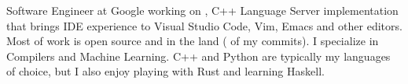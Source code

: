 
\begin{cvparagraph}
  Software Engineer at Google working on
  , C++ Language Server implementation
  that brings IDE experience to Visual Studio Code, Vim, Emacs and other
  editors. Most of work is open source and in the
   land
  (
  of my commits). I specialize in Compilers and Machine Learning. C++ and
  Python are typically my languages of choice, but I also enjoy playing with
  Rust and learning Haskell.
\end{cvparagraph}
